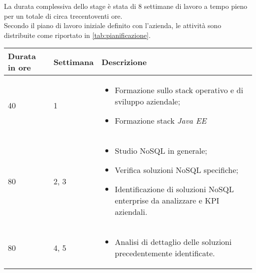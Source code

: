 La durata complessiva dello stage è stata di 8 settimane di lavoro a tempo pieno per un totale di circa trecentoventi ore.\\
\noindent Secondo il piano di lavoro iniziale definito con l'azienda, le attività sono distribuite come riportato in \autoref{tab:pianificazione}.\\

\begin{center}

        \renewcommand{\arraystretch}{1.5}
    
        \centering
        \begin{longtable}{| C{2.5cm} | C{2cm} | L{7.2cm} | }
            
            \hline
            
            \textbf{Durata in ore} & \textbf{Settimana} & \textbf{Descrizione} \\
            
            \hline
            
            40 & 1 &
            \begin{itemize}[leftmargin=*]
                \item Formazione sullo stack operativo e di sviluppo aziendale;
                \item Formazione stack \textit{Java EE}
            \end{itemize} \\
            
            \hline
            
            80 & 2, 3 &
            \begin{itemize}[leftmargin=*]
                \item Studio NoSQL in generale;
                \item Verifica soluzioni NoSQL specifiche;
                \item Identificazione di soluzioni NoSQL enterprise da analizzare e \gls{KPI} aziendali. 
            \end{itemize}  \\
            
            \hline
        
            
            80 & 4, 5 &
            \begin{itemize}[leftmargin=*]
                \item Analisi di dettaglio delle soluzioni precedentemente identificate. 
            \end{itemize}  \\
             

\end{longtable}
\end{center}
